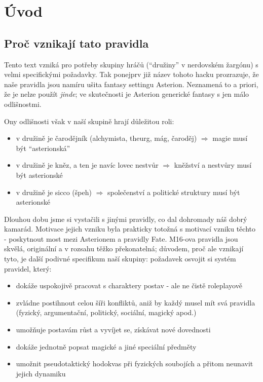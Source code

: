 \documentclass[../main.tex]{subfiles}
\begin{document}
\chapter{Úvod}
\label{chap:introduction}

\section{Proč vznikají tato pravidla}
\label{sec:proc-pravidla}

Tento text vzniká pro potřeby skupiny hráčů (``družiny'' v nerdovském žargónu) s velmi specifickými požadavky. Tak ponejprv již název tohoto hacku prozrazuje, že naše pravidla jsou namíru ušita fantasy settingu Asterion. Neznamená to a priori, že je nelze použít \textit{jinde}; ve skutečnosti je Asterion generické fantasy s jen málo odlišnostmi. 

Ony odlišnosti však v naší skupině hrají důležitou roli:

\begin{itemize}
\item v družině je čarodějník (alchymista, theurg, mág, čaroděj) $\Rightarrow$ magie musí být ``asterionská''
\item v družině je kněz, a ten je navíc lovec nestvůr $\Rightarrow$ kněžství a nestvůry musí být asterionské
\item v družině je sicco (špeh) $\Rightarrow$ společenství a politické struktury musí být asterionské
\end{itemize}

Dlouhou dobu jsme si vystačili s jinými pravidly, co dal dohromady náš dobrý kamarád. Motivace jejich vzniku byla prakticky totožná s motivací vzniku těchto - poskytnout most mezi Asterionem  a pravidly Fate. M16-ova pravidla jsou skvělá, originální a v rozsahu těžko překonatelná; důvodem, proč ale vznikají tyto, je další podivné specifikum naší skupiny: požadavek osvojit si systém pravidel, který:

\begin{itemize}
\item dokáže uspokojivě pracovat s charaktery postav - ale ne čistě roleplayově
\item zvládne postihnout celou šíři konfliktů, aniž by každý musel mít svá pravidla (fyzický, argumentační, politický, sociální, magický apod.)
\item umožňuje postavám růst a vyvíjet se, získávat nové dovednosti
\item dokáže jednotně popsat magické a jiné speciální předměty
\item umožnit pseudotaktický hodokvas při fyzických soubojích a přitom neunavit jejich dynamiku
\end{itemize}
\end{document}
